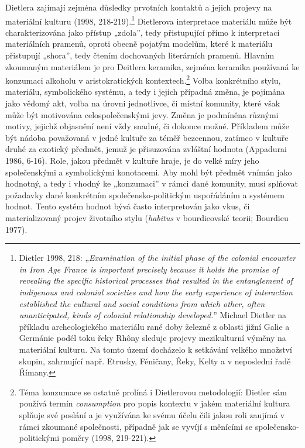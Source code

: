 Dietlera zajímají zejména důsledky prvotních kontaktů a jejich projevy na materiální kulturu (1998, 218-219).\footnote{Dietler 1998, 218: „{\em Examination of the initial phase of the colonial encounter in Iron Age France is important precisely because it holds the promise of revealing the specific historical processes that resulted in the entanglement of indigenous and colonial societies and how the early experience of interaction established the cultural and social conditions from which other, often unanticipated, kinds of colonial relationship developed.}” Michael Dietler na příkladu archeologického materiálu rané doby železné z oblasti jižní Galie a Germánie podél toku řeky Rhôny sleduje projevy mezikulturní výměny na materiální kulturu. Na tomto území docházelo k setkávání velkého množství skupin, zahrnující např. Etrusky, Féničany, Řeky, Kelty a v neposlední řadě Římany.} Dietlerova interpretace materiálu může být charakterizována jako přístup „zdola”, tedy přistupující přímo k interpretaci materiálních pramenů, oproti obecně pojatým modelům, které k materiálu přistupují „shora”, tedy čtením dochovaných literárních pramenů. Hlavním zkoumaným materiálem je pro Deitlera keramika, zejména keramika používaná ke konzumaci alkoholu v aristokratických kontextech.\footnote{Téma konzumace se ostatně prolíná i Dietlerovou metodologií: Dietler sám používá termín {\em consumption} pro popis kontextu v jakém materiální kultura splňuje své poslání a je využívána ke svému účelu čili jakou roli zaujímá v rámci zkoumané společnosti, případně jak se vyvíjí s měnícími se společensko-politickými poměry (1998, 219-221).} Volba konkrétního stylu, materiálu, symbolického systému, a tedy i jejich případná změna, je pojímána jako vědomý akt, volba na úrovni jednotlivce, či místní komunity, které však může být motivována celospolečenskými jevy. Změna je podmíněna různými motivy, jejichž objasnění není vždy snadné, či dokonce možné. Příkladem může být nádoba považovaná v jedné kultuře za téměř bezcennou, zatímco v kultuře druhé za exotický předmět, jemuž je přisuzována zvláštní hodnota (Appadurai 1986, 6-16). Role, jakou předmět v kultuře hraje, je do velké míry jeho společenskými a symbolickými konotacemi. Aby mohl být předmět vnímán jako hodnotný, a tedy i vhodný ke „konzumaci” v rámci dané komunity, musí splňovat požadavky dané konkrétním společensko-politickým uspořádáním a systémem hodnot. Tento systém hodnot bývá často interpretován jako vkus, či materializovaný projev životního stylu ({\em habitus} v bourdieovské teorii; Bourdieu 1977).

